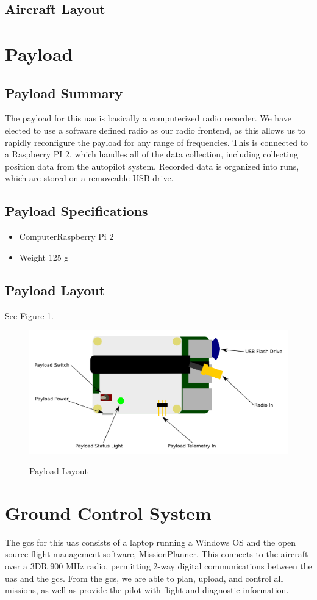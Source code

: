 \documentclass{report}
\begin{document}
		\subsection{Aircraft Layout}
	\section{Payload}
		\subsection{Payload Summary}
			The payload for this \gls{uas} is basically a computerized radio recorder.  We have elected to use a software defined radio as our radio frontend, as this allows us to rapidly reconfigure the payload for any range of frequencies.  This is connected to a Raspberry PI 2, which handles all of the data collection, including collecting position data from the autopilot system.  Recorded data is organized into runs, which are stored on a removeable USB drive.
		\subsection{Payload Specifications}
			\begin{itemize}
				\item Computer\hfill Raspberry Pi 2
				\item Weight \hfill 125 g
			\end{itemize}
		\subsection{Payload Layout}
			See Figure \ref{fig:payload_layout}.
			\begin{figure}[ht]
				\centering
				\caption{Payload Layout}
				\includegraphics[width=\textwidth]{payload_layout.png}
				\label{fig:payload_layout}
			\end{figure}
	\section{Ground Control System}
		The \gls{gcs} for this \gls{uas} consists of a laptop running a Windows OS and the open source flight management software, MissionPlanner.  This connects to the aircraft over a 3DR 900 MHz radio, permitting 2-way digital communications between the \gls{uas} and the \gls{gcs}.  From the \gls{gcs}, we are able to plan, upload, and control all missions, as well as provide the pilot with flight and diagnostic information.
\end{document}

